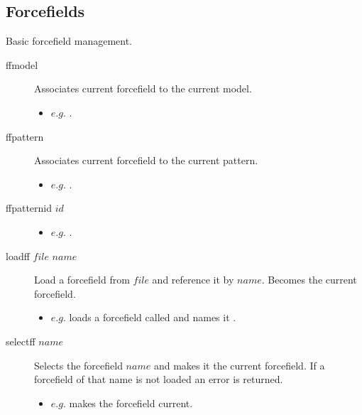 \subsection{Forcefields}
Basic forcefield management.\\
\begin{description}

	\item[ffmodel\its] Associates current forcefield to the current model.
	\begin{itemize}
		\item $e.g.$ .
	\end{itemize}

	\item[ffpattern\its] Associates current forcefield to the current pattern.
	\begin{itemize}
		\item $e.g.$ .
	\end{itemize}

	\item[ffpatternid $id$\its] 
	\begin{itemize}
		\item $e.g.$ .
	\end{itemize}

	\item[loadff $file$ $name$\its] Load a forcefield from $file$ and reference it by $name$. Becomes the current forcefield.
	\begin{itemize}
		\item $e.g.$  loads a forcefield called  and names it .
	\end{itemize}

	\item[selectff $name$\its] Selects the forcefield $name$ and makes it the current forcefield. If a forcefield of that name is not loaded an error is returned.
	\begin{itemize}
		\item $e.g.$  makes the forcefield  current.
	\end{itemize}

\end{description}


